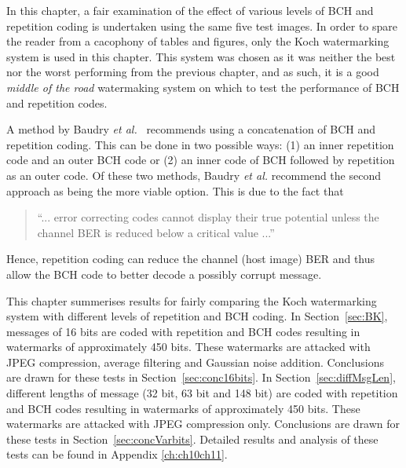 \documentclass[12pt]{report}
\begin{document}
In this chapter, a fair examination of the effect of various levels of BCH and repetition coding
is undertaken using the
same five test images. 
In order to spare the reader from a cacophony of tables and figures, only the Koch watermarking system is
used in this chapter. 
This system was chosen as it was neither the best nor the worst performing from
the previous chapter,
and as such, it is a good \emph{middle of the road} watermaking system on which to test the performance of BCH and
repetition codes. 

A method by Baudry \emph{et al.}~\cite{BK:baudryPaper} 
recommends using a concatenation of BCH and repetition coding. This can be done in
two possible ways: (1) an inner repetition code and an outer BCH code or 
(2) an inner code of BCH followed by repetition as an outer code.
Of these two methods, Baudry \emph{et al.} recommend the second approach as being 
the more viable option. This is due to the fact that
\begin{quote}
``... error correcting codes cannot display their true potential unless the channel BER is reduced below a
critical value ...''
\end{quote}
Hence, repetition coding can reduce the channel (host image) BER and thus allow the BCH code to better decode a possibly
corrupt message.

This chapter summerises results for fairly comparing the Koch watermarking system with different levels
of repetition and BCH coding. In Section~\ref{sec:BK}, messages of 16 bits are coded with repetition 
and BCH codes resulting in watermarks of approximately 450 bits. These watermarks are attacked 
with JPEG compression, average filtering and Gaussian noise addition. 
Conclusions are drawn for these tests in Section~\ref{sec:conc16bits}.
In Section~\ref{sec:diffMsgLen},
different lengths of message (32 bit, 63 bit and 148 bit) are coded with repetition and BCH codes 
resulting in watermarks of approximately 450 bits. These watermarks are attacked with JPEG compression only.
Conclusions are drawn for these tests in Section~\ref{sec:concVarbits}.
Detailed results and analysis of these tests can be found in Appendix \ref{ch:ch10ch11}.
\end{document}
